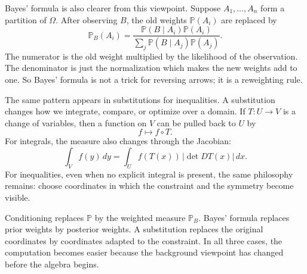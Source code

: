 Bayes' formula is also clearer from this viewpoint.  Suppose \(A_1,\ldots,A_n\) form a partition of \(\Omega\).  After observing \(B\), the old weights \(\mathbb P(A_i)\) are replaced by
\[
  \mathbb P_B(A_i)
  =\frac{\mathbb P(B\mid A_i)\mathbb P(A_i)}{\sum_j\mathbb P(B\mid A_j)\mathbb P(A_j)}.
\]
The numerator is the old weight multiplied by the likelihood of the observation.  The denominator is just the normalization which makes the new weights add to one.  So Bayes' formula is not a trick for reversing arrows; it is a reweighting rule.

The same pattern appears in substitutions for inequalities.  A substitution changes how we integrate, compare, or optimize over a domain.  If \(T:U\to V\) is a change of variables, then a function on \(V\) can be pulled back to \(U\) by
\[
  f\longmapsto f\circ T.
\]
For integrals, the measure also changes through the Jacobian:
\[
  \int_V f(y)\,dy
  =\int_U f(T(x))\,\left|\det DT(x)\right|\,dx.
\]
For inequalities, even when no explicit integral is present, the same philosophy remains: choose coordinates in which the constraint and the symmetry become visible.

\begin{remark}
Conditioning replaces \(\mathbb P\) by the weighted measure \(\mathbb P_B\).  Bayes' formula replaces prior weights by posterior weights.  A substitution replaces the original coordinates by coordinates adapted to the constraint.  In all three cases, the computation becomes easier because the background viewpoint has changed before the algebra begins.
\end{remark}
